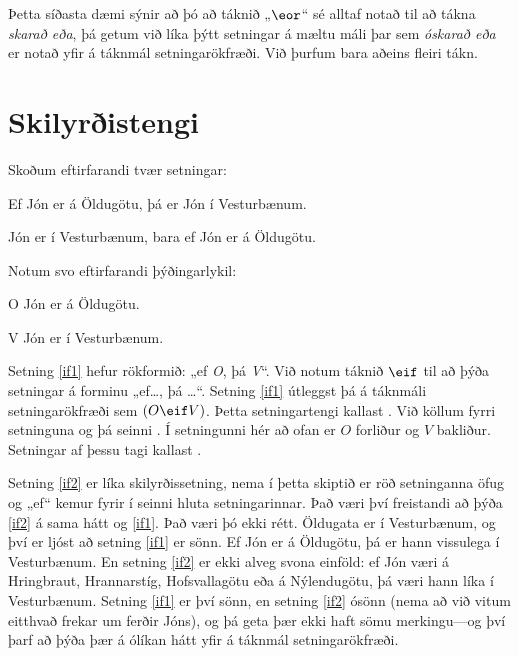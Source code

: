 Þetta síðasta dæmi sýnir að þó að táknið „$\eor$“ sé alltaf notað til að tákna \emph{skarað eða}, þá getum við líka þýtt setningar á mæltu máli þar sem \emph{óskarað eða} er notað yfir á táknmál setningarökfræði. Við þurfum bara aðeins fleiri tákn.

\section{Skilyrðistengi}
Skoðum eftirfarandi tvær setningar:
	\begin{earg}
		\item[\ex{if1}] Ef Jón er á Öldugötu, þá er Jón í Vesturbænum.
		\item[\ex{if2}] Jón er í Vesturbænum, bara ef Jón er á Öldugötu.
	\end{earg}
Notum svo eftirfarandi þýðingarlykil:
	\begin{ekey}
		\item[O] Jón er á Öldugötu.
		\item[V] Jón er í Vesturbænum.
	\end{ekey}
Setning \ref{if1} hefur rökformið: „ef \emph{O}, þá \emph{V}“. Við notum táknið $\eif$ til að þýða setningar á forminu „ef\ldots, þá \ldots“. Setning \ref{if1} útleggst þá á táknmáli setningarökfræði sem $(O \eif V)$. Þetta setningartengi kallast . Við köllum fyrri setninguna  og þá seinni . Í setningunni hér að ofan er $O$ forliður og $V$ bakliður. Setningar af þessu tagi kallast .
	
Setning \ref{if2} er líka skilyrðissetning, nema í þetta skiptið er röð setninganna öfug og „ef“ kemur fyrir í seinni hluta setningarinnar. Það væri því freistandi að þýða \ref{if2} á sama hátt og \ref{if1}. Það væri þó ekki rétt. Öldugata er í Vesturbænum, og því er ljóst að setning \ref{if1} er sönn. Ef Jón er á Öldugötu, þá er hann vissulega í Vesturbænum. En setning \ref{if2} er ekki alveg svona einföld: ef Jón væri á Hringbraut, Hrannarstíg, Hofsvallagötu eða á Nýlendugötu, þá væri hann líka í Vesturbænum. Setning \ref{if1} er því sönn, en setning \ref{if2} ósönn (nema að við vitum eitthvað frekar um ferðir Jóns), og þá geta þær ekki haft sömu merkingu---og því þarf að þýða þær á ólíkan hátt yfir á táknmál setningarökfræði.
	
